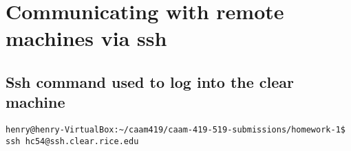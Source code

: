 \documentclass[10pt,a4paper]{article}
\title{CAAM 519, Homework #1: \LaTeX\  Submission}
\author{\texttt{hc54}}
\date{September 7, 2022}
\begin{document}
\maketitle

\section{Communicating with remote machines via ssh}
\subsection{Ssh command used to log into the clear machine}
\begin{verbatim}
henry@henry-VirtualBox:~/caam419/caam-419-519-submissions/homework-1$ ssh hc54@ssh.clear.rice.edu
\end{verbatim}
\end{document}
